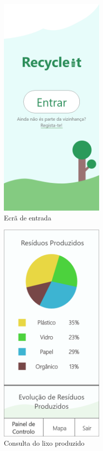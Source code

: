 \documentclass[11pt, a4paper, oneside]{book}
\begin{document}
\begin{appendices}
\begin{figure}[h!]
    \begin{subfigure}[t]{0.33\textwidth}
        \centering
        \includegraphics[width=52mm]{img/mockups/tlmv-1.png}
        \caption{Ecrã de entrada}
    \end{subfigure}%
    \begin{subfigure}[t]{0.33\textwidth}
        \centering
        \includegraphics[width=52mm]{img/mockups/tlmv-2.png}
        \caption{Consulta do lixo produzido}
    \end{subfigure}%
    \begin{subfigure}[t]{0.33\textwidth}

\end{subfigure}
\end{figure}
\end{appendices}
\end{document}
